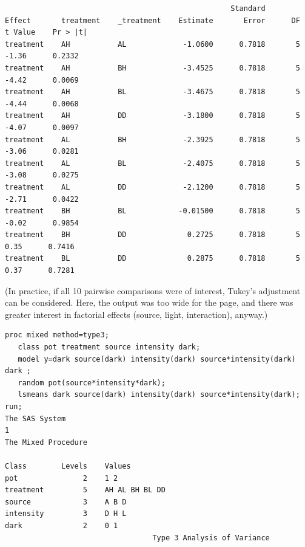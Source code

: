 \begin{LARGE}
\begin{small}
\begin{verbatim}
                                                    Standard
Effect       treatment    _treatment    Estimate       Error      DF    t Value    Pr > |t|
treatment    AH           AL             -1.0600      0.7818       5      -1.36      0.2332
treatment    AH           BH             -3.4525      0.7818       5      -4.42      0.0069
treatment    AH           BL             -3.4675      0.7818       5      -4.44      0.0068
treatment    AH           DD             -3.1800      0.7818       5      -4.07      0.0097
treatment    AL           BH             -2.3925      0.7818       5      -3.06      0.0281
treatment    AL           BL             -2.4075      0.7818       5      -3.08      0.0275
treatment    AL           DD             -2.1200      0.7818       5      -2.71      0.0422
treatment    BH           BL            -0.01500      0.7818       5      -0.02      0.9854
treatment    BH           DD              0.2725      0.7818       5       0.35      0.7416
treatment    BL           DD              0.2875      0.7818       5       0.37      0.7281
\end{verbatim}
\end{small}
(In practice, if all 10 pairwise comparisons were of interest, Tukey's adjustment
can be considered.  Here, the output was too wide for the page, and there was greater
interest in factorial effects (source, light, interaction), anyway.)
\newpage
{}
\begin{small}
\begin{verbatim}
proc mixed method=type3;
   class pot treatment source intensity dark;
   model y=dark source(dark) intensity(dark) source*intensity(dark) dark ;
   random pot(source*intensity*dark);
   lsmeans dark source(dark) intensity(dark) source*intensity(dark);
run;
The SAS System                                                                                1
The Mixed Procedure

Class        Levels    Values
pot               2    1 2                           
treatment         5    AH AL BH BL DD                
source            3    A B D                         
intensity         3    D H L                         
dark              2    0 1                           
                                  Type 3 Analysis of Variance
 

\end{verbatim}
\end{small}
\end{LARGE}
